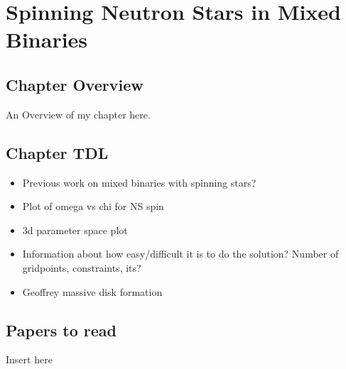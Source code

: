 \chapter{Spinning Neutron Stars in Mixed Binaries}

\section{Chapter Overview}

An Overview of my chapter here.

\section{Chapter TDL}
\begin{itemize}
\item Previous work on mixed binaries with spinning stars?
\item Plot of omega vs chi for NS spin
\item 3d parameter space plot
\item Information about how easy/difficult it is to do the solution?
  Number of gridpoints, constraints, its?
\item Geoffrey massive disk formation 
\end{itemize}


\section{Papers to read}

Insert here






